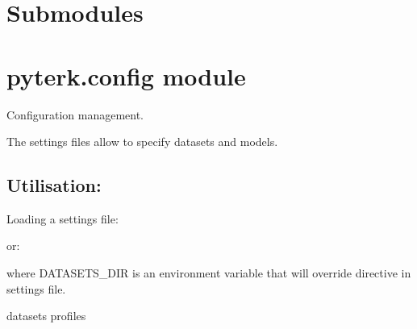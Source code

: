 \documentclass[letterpaper,10pt,english]{sphinxmanual}
\begin{document}
\section{Submodules}
\label{\detokenize{PyTerK:submodules}}

\section{pyterk.config module}
\label{\detokenize{PyTerK:module-pyterk.config}}\label{\detokenize{PyTerK:pyterk-config-module}}
\sphinxAtStartPar
Configuration management.

\sphinxAtStartPar
The settings files allow to specify datasets and models.


\subsection{Utilisation:}
\label{\detokenize{PyTerK:utilisation}}
\sphinxAtStartPar
Loading a settings file:

\begin{sphinxVerbatim}[commandchars=\\\{\}]
  
\end{sphinxVerbatim}

\sphinxAtStartPar
or:

\begin{sphinxVerbatim}[commandchars=\\\{\}]
  
\end{sphinxVerbatim}

\sphinxAtStartPar
where DATASETS\_DIR is an environment variable that will override 
directive in settings file.

\begin{fulllineitems}
\label{\detokenize{PyTerK:pyterk.config.datasets}}
\sphinxAtStartPar
datasets profiles

\end{fulllineitems}
\end{document}
